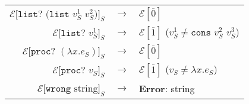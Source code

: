 \begin{figure}
\begin{center}
\begin{tabular}{rcl}
$\mathscr{E}[\mathtt{list?}$ $(\mathtt{list}$ $v_{S}^{1}$ $v_{S}^{2})]_{S}$ & $\rightarrow$ & $\mathscr{E}[\overline{0}]$ \\
$\mathscr{E}[\mathtt{list?}$ $v_{S}^{1}]_{S}$ & $\rightarrow$ & $\mathscr{E}[\overline{1}]$ ($v_{S}^{1}\neq\mathtt{cons}$ $v_{S}^{2}$ $v_{S}^{3}$) \\
$\mathscr{E}[\mathtt{proc?}$ $(\lambda x.e_{S})]_{S}$ & $\rightarrow$ & $\mathscr{E}[\overline{0}]$ \\
$\mathscr{E}[\mathtt{proc?}$ $v_{S}]_{S}$ & $\rightarrow$ & $\mathscr{E}[\overline{1}]$ ($v_{S}\neq\lambda x.e_{S}$) \\
$\mathscr{E}[\mathtt{wrong}$ $\mathrm{string}]_{S}$ & $\rightarrow$ & \textbf{Error}: string
\end{tabular}
\end{center}
\end{figure}